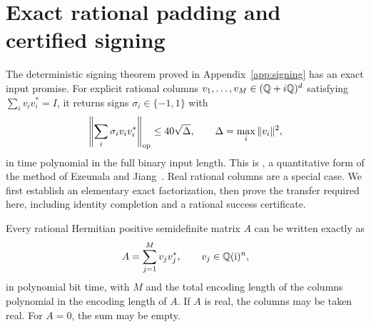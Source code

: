 \section{Exact rational padding and certified signing}
\label{sec:signing}


The deterministic signing theorem proved in Appendix~\ref{app:signing}
has an exact input promise. For explicit
rational columns $v_1,\ldots,v_M\in(\mathbb Q+i\mathbb Q)^d$ satisfying
$\sum_i v_iv_i^*=I$, it returns signs $\sigma_i\in\{-1,1\}$ with
\begin{equation}
 \left\|\sum_i\sigma_i v_iv_i^*\right\|_{\mathrm{op}}
       \le40\sqrt{\Delta},\qquad
       \Delta=\max_i\|v_i\|^2,
 \label{eq:ta-signing-input}
\end{equation}
in time polynomial in the full binary input length. This is
, a quantitative form of the method of
Ezeunala and Jiang~\cite{EzeunalaJiang2026}. Real rational columns are a
special case. We first establish an elementary exact factorization, then prove the
transfer required here, including identity completion and a rational
success certificate.

\begin{lemma}
\label{lem:rational-psd}
Every rational Hermitian positive semidefinite matrix $A$ can be written
exactly as
\[
                         A=\sum_{j=1}^M v_jv_j^*,
 \qquad v_j\in\mathbb Q(\mathrm i)^n,
\]
in polynomial bit time, with $M$ and the total encoding length of the
columns polynomial in the encoding length of $A$.  If $A$ is real,
the columns may be taken real.  For $A=0$, the sum may be empty.
\end{lemma}

